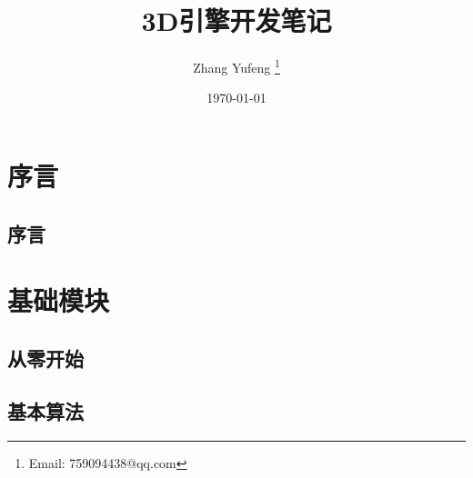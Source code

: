 \documentclass[
    UTF8,       %
    b5paper,    %
    10pt,       %
    oneside,    %
    openright,  %
    titlepage,  %
    final       %
]{ctexbook}
\title{3D引擎开发笔记}
\author{ Zhang Yufeng \thanks{Email: 759094438@qq.com} }
\date{\today}
\begin{document}
    \maketitle
    \tableofcontents

    \frontmatter

    \maketitle
    \part{序言}

    \maketitle
    \chapter{序言}
    

    \mainmatter

    \maketitle
    \part{基础模块}

    \maketitle
    \chapter{从零开始}
    
    
    
    
    

    \maketitle
    \chapter{基本算法}

\end{document}
